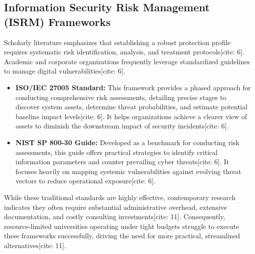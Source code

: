 \documentclass[journal,onecolumn,12pt,twoside]{IEEEtran}
\begin{document}
	\subsection{Information Security Risk Management (ISRM) Frameworks}
	\label{subsec:isrm_frameworks}
	Scholarly literature emphasizes that establishing a robust protection profile requires systematic risk identification, analysis, and treatment protocols[cite: 6]. Academic and corporate organizations frequently leverage standardized guidelines to manage digital vulnerabilities[cite: 6].
	\begin{itemize}
		\item \textbf{ISO/IEC 27005 Standard:} This framework provides a phased approach for conducting comprehensive risk assessments, detailing precise stages to discover system assets, determine threat probabilities, and estimate potential baseline impact levels[cite: 6]. It helps organizations achieve a clearer view of assets to diminish the downstream impact of security incidents[cite: 6].
		\item \textbf{NIST SP 800-30 Guide:} Developed as a benchmark for conducting risk assessments, this guide offers practical strategies to identify critical information parameters and counter prevailing cyber threats[cite: 6]. It focuses heavily on mapping systemic vulnerabilities against evolving threat vectors to reduce operational exposure[cite: 6].
	\end{itemize}
	While these traditional standards are highly effective, contemporary research indicates they often require substantial administrative overhead, extensive documentation, and costly consulting investments[cite: 11]. Consequently, resource-limited universities operating under tight budgets struggle to execute these frameworks successfully, driving the need for more practical, streamlined alternatives[cite: 11].
	
\end{document}
